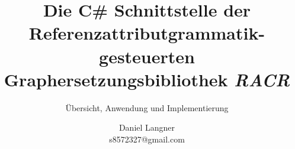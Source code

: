

\titlehead{}
\subject{Entwicklerhandbuch}
\title{Die C\# Schnittstelle der Referenzattributgrammatik-gesteuerten Graphersetzungsbibliothek \emph{RACR}}
\subtitle{{\"U}bersicht, Anwendung und Implementierung}
\author{Daniel Langner
	\\ {\small\ttfamily s8572327@gmail.com}}
\date{} %
\publishers{Editor: Christoff B{\"u}rger}
\lowertitleback{RACR .NET Entwicklerhandbuch
	\\ RACR Distribution und Homepage: {\small\bfseries\ttfamily https://github.com/christoff-buerger/racr}}
\maketitle
